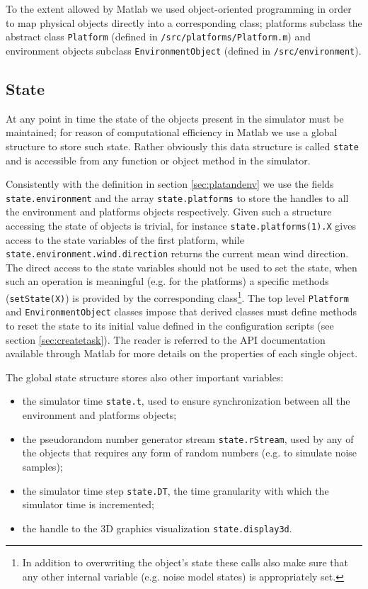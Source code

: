 \documentclass[a4paper,11pt]{report}
\begin{document}
To the extent allowed by Matlab we used object-oriented programming in order to map physical objects directly into a corresponding class; platforms subclass the abstract class \texttt{Platform} (defined in \texttt{/src/platforms/Platform.m}) and environment objects subclass \texttt{EnvironmentObject} (defined in \texttt{/src/environment}).

\subsection{State}\label{sec:state}

At any point in time the state of the objects present in the simulator must be maintained; for reason of computational efficiency in Matlab we use a global structure to store such state. Rather obviously this data structure is called \texttt{state} and is accessible from any function or object method in the simulator.

Consistently with the definition in section \ref{sec:platandenv} we use the fields \texttt{state.environment} and the array \texttt{state.platforms} to store the handles to all the environment and platforms objects respectively. 
Given such a structure accessing the state of objects is trivial, for instance \texttt{state.platforms(1).X} gives access to the state variables of the first platform, while \texttt{state.environment.wind.direction} returns the current mean wind direction. 
The direct access to the state variables should not be used to set the state, when such an operation is meaningful (e.g. for the platforms) a specific methods (\texttt{setState(X)}) is provided by the corresponding class\footnote{In addition to overwriting the object's state these calls also make sure that 
any other internal variable (e.g. noise model states) is appropriately set.}.
The top level \texttt{Platform} and \texttt{EnvironmentObject} classes impose that derived classes must define methods to reset the state to its initial value defined in the configuration scripts (see section \ref{sec:createtask}).
The reader is referred to the API documentation available through Matlab for more details on the properties of each single object.

The global state structure stores also other important variables:
\begin{itemize}
 \item the simulator time \texttt{state.t}, used to ensure synchronization between all the environment and platforms objects;
 \item the pseudorandom number generator stream \texttt{state.rStream}, used by any of the objects that requires any form of random numbers (e.g. to simulate noise samples);
 \item the simulator time step \texttt{state.DT}, the time granularity with which the simulator time is incremented;
 \item the handle to the 3D graphics visualization \texttt{state.display3d}.
\end{itemize}
\end{document}
